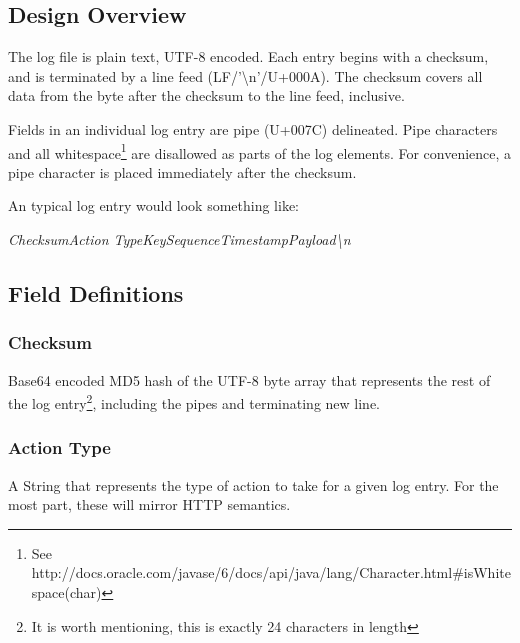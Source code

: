 \subsection{Design Overview}

The log file is plain text, UTF-8 encoded.  Each entry begins with a checksum, and is terminated by a line feed (LF/'\textbackslash n'/U+000A). The checksum covers all data from the byte after the checksum to the line feed, inclusive.

Fields in an individual log entry are pipe (U+007C) delineated. Pipe characters and all whitespace\footnote{See http://docs.oracle.com/javase/6/docs/api/java/lang/Character.html\#isWhitespace(char)} are disallowed as parts of the log elements.  For convenience, a pipe character is placed immediately after the checksum.

An typical log entry would look something like:
\begin{center}
\em Checksum\textbar Action Type\textbar Key\textbar Sequence\textbar Timestamp\textbar Payload\textbackslash n
\end{center}


\subsection{Field Definitions}

\subsubsection{Checksum}
Base64 encoded MD5 hash of the UTF-8 byte array that represents the rest of the log entry\footnote{It is worth mentioning, this is exactly 24 characters in length}, including the pipes and terminating new line.

\subsubsection{Action Type}
A String that represents the type of action to take for a given log entry.  For the most part, these will mirror HTTP semantics.

